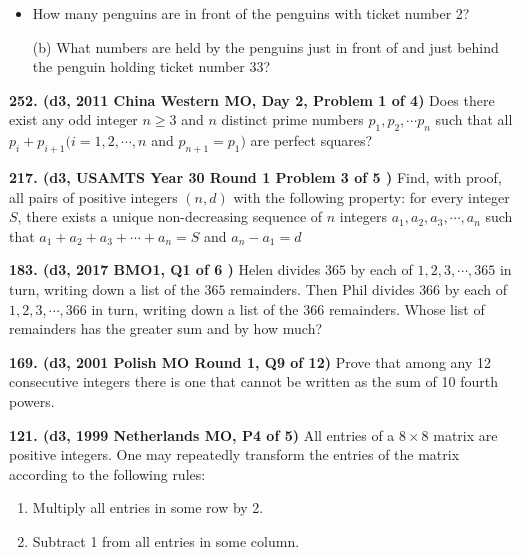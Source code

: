 \documentclass{article}
\begin{document}
\begin{itemize}

    \item How many penguins are in front of the penguins with ticket number 2?

    \item[(b)] What numbers are held by the penguins just in front of and just behind the penguin holding ticket number 33?

\end{itemize}

\textbf{252. (\color{red}d3\color{black}, 2011 China Western MO, Day 2, Problem 1 of 4)} Does there exist any odd integer $n \geq 3$ and $n$ distinct prime numbers $p_1 , p_2, \cdots p_n$ such that all $p_i + p_{i+1} (i = 1,2,\cdots , n$ and $p_{n+1} = p_{1})$ are perfect squares?

\textbf{217. (\color{red}d3\color{black}, USAMTS Year 30 Round 1 Problem 3 of 5 )} Find, with proof, all pairs of positive integers $(n, d)$ with the following property: for every integer $S$, there exists a unique non-decreasing sequence of $n$ integers $a_1 , a_2 , a_3 , \cdots , a_n$ such that $a_1 + a_2 + a_3 + \cdots + a_n = S$ and $a_n - a_1 = d$

\textbf{183. (\color{red}d3\color{black}, 2017 BMO1, Q1 of 6 )} Helen divides $365$ by each of $1, 2, 3, \cdots, 365$ in turn, writing down a list of the $365$ remainders. Then Phil divides $366$ by each of $1, 2, 3, \cdots , 366$ in turn, writing down a list of the $366$ remainders. Whose list of remainders has the greater sum and by how much?

\textbf{169. (\color{red}d3\color{black}, 2001 Polish MO Round 1, Q9 of 12)} Prove that among any 12 consecutive integers there is one that cannot be written as the sum of 10 fourth powers.



\textbf{121. (\color{red}d3\color{black}, 1999 Netherlands MO, P4 of 5)} All entries of a \(8 \times 8\) matrix are positive integers. One may repeatedly transform the entries of the matrix according to the following rules:

\begin{enumerate}

    \item Multiply all entries in some row by 2.

    \item Subtract 1 from all entries in some column.

\end{enumerate}
\end{document}
